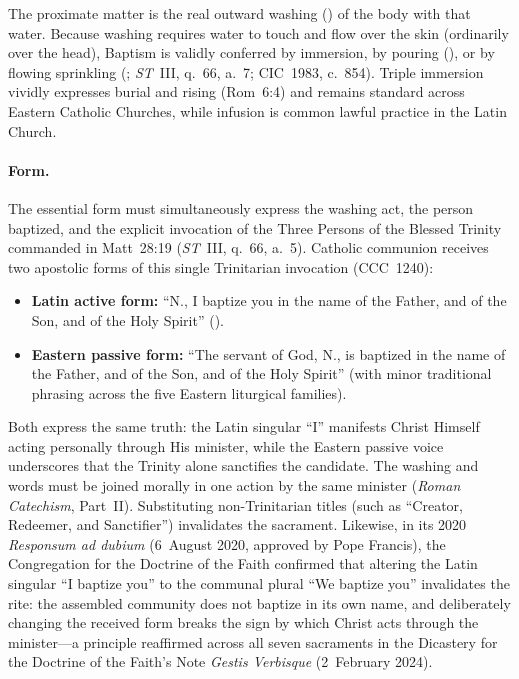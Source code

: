 The proximate matter is the real outward washing () of the body with that water. Because washing requires water to touch and flow over the skin (ordinarily over the head), Baptism is validly conferred by immersion, by pouring (), or by flowing sprinkling (; \emph{ST}~III, q.~66, a.~7; CIC~1983, c.~854). Triple immersion vividly expresses burial and rising (Rom~6:4) and remains standard across Eastern Catholic Churches, while infusion is common lawful practice in the Latin Church.

\paragraph{Form.}
The essential form must simultaneously express the washing act, the person baptized, and the explicit invocation of the Three Persons of the Blessed Trinity commanded in Matt~28:19 (\emph{ST}~III, q.~66, a.~5). Catholic communion receives two apostolic forms of this single Trinitarian invocation (CCC~1240):
\begin{itemize}
  \item \textbf{Latin active form:} ``N., I baptize you in the name of the Father, and of the Son, and of the Holy Spirit'' ().
  \item \textbf{Eastern passive form:} ``The servant of God, N., is baptized in the name of the Father, and of the Son, and of the Holy Spirit'' (with minor traditional phrasing across the five Eastern liturgical families).
\end{itemize}
Both express the same truth: the Latin singular ``I'' manifests Christ Himself acting personally through His minister, while the Eastern passive voice underscores that the Trinity alone sanctifies the candidate. The washing and words must be joined morally in one action by the same minister (\emph{Roman Catechism}, Part~II). Substituting non-Trinitarian titles (such as ``Creator, Redeemer, and Sanctifier'') invalidates the sacrament. Likewise, in its 2020 \emph{Responsum ad dubium} (6~August 2020, approved by Pope Francis), the Congregation for the Doctrine of the Faith confirmed that altering the Latin singular ``I baptize you'' to the communal plural ``We baptize you'' invalidates the rite: the assembled community does not baptize in its own name, and deliberately changing the received form breaks the sign by which Christ acts through the minister---a principle reaffirmed across all seven sacraments in the Dicastery for the Doctrine of the Faith's Note \emph{Gestis Verbisque} (2~February 2024).


